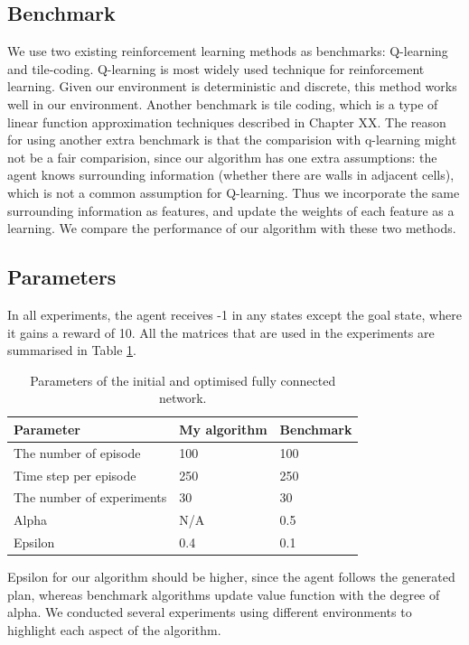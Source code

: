 \subsection{Benchmark}
We use two existing reinforcement learning methods as benchmarks: Q-learning and tile-coding. 
Q-learning is most widely used technique for reinforcement learning. Given our environment is deterministic and discrete, this method works well in our environment.
Another benchmark is tile coding, which is a type of linear function approximation techniques described in Chapter XX.
The reason for using another extra benchmark is that the comparision with q-learning might not be a fair comparision,
since our algorithm has one extra assumptions: the agent knows surrounding information (whether there are walls in adjacent cells),
which is not a common assumption for Q-learning. Thus we incorporate the same surrounding information as features, and update the weights of each feature as a learning.
We compare the performance of our algorithm with these two methods.

\subsection{Parameters}
In all experiments, the agent receives -1 in any states except the goal state, where it gains a reward of 10.
All the matrices that are used in the experiments are summarised in Table \ref{param}. 

\begin{table}[!ht!b]
\centering
\begin{tabular}{lll}
\hline
Parameter            & My algorithm    & Benchmark      \\ \hline
The number of episode& 100        & 100        \\
Time step per episode& 250        & 250        \\
The number of experiments& 30       & 30       \\
Alpha                & N/A       & 0.5       \\
Epsilon              & 0.4        & 0.1        \\
\end{tabular}
\caption{Parameters of the initial and optimised fully connected network.}
\label{param}
\end{table}

Epsilon for our algorithm should be higher, since the agent follows the generated plan, 
whereas benchmark algorithms update value function with the degree of alpha. 
We conducted several experiments using different environments to highlight each aspect of the algorithm.

